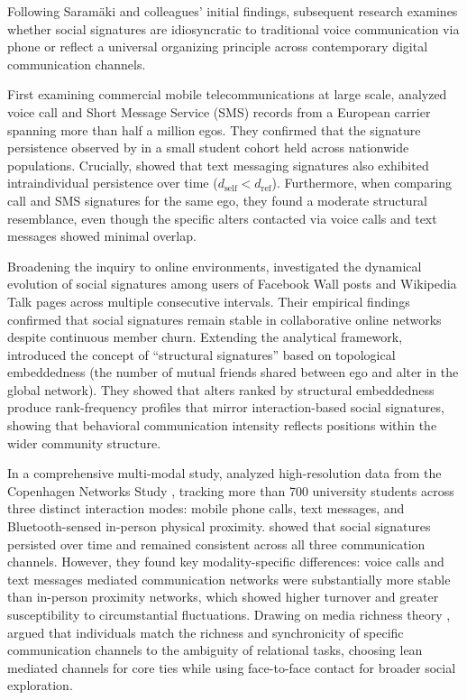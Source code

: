 \documentclass[11pt,letterpaper]{article}
\newcommand{\dself}{d_{\mathrm{self}}}
\newcommand{\dref}{d_{\mathrm{ref}}}
\begin{document}
Following Saram{\"a}ki and colleagues' initial findings, subsequent research examines whether social signatures are idiosyncratic to traditional voice communication via phone or reflect a universal organizing principle across contemporary digital communication channels. 

First examining commercial mobile telecommunications at large scale, \citet{heydari2018multichannel} analyzed voice call and Short Message Service (SMS) records from a European carrier spanning more than half a million egos. They confirmed that the signature persistence observed by \citet{saramaeki2014persistence} in a small student cohort held across nationwide populations. Crucially, \citet{heydari2018multichannel} showed that text messaging signatures also exhibited intraindividual persistence over time ($\dself < \dref$). Furthermore, when comparing call and SMS signatures for the same ego, they found a moderate structural resemblance, even though the specific alters contacted via voice calls and text messages showed minimal overlap. 

Broadening the inquiry to online environments, \citet{li2018social} investigated the dynamical evolution of social signatures among users of Facebook Wall posts and Wikipedia Talk pages across multiple consecutive intervals. Their empirical findings confirmed that social signatures remain stable in collaborative online networks despite continuous member churn. Extending the analytical framework, \citet{li2018social} introduced the concept of ``structural signatures'' based on topological embeddedness (the number of mutual friends shared between ego and alter in the global network). They showed that alters ranked by structural embeddedness produce rank-frequency profiles that mirror interaction-based social signatures, showing that behavioral communication intensity reflects positions within the wider community structure.

In a comprehensive multi-modal study, \citet{li2022evidence} analyzed high-resolution data from the Copenhagen Networks Study \citep{stopczynski2014measuring}, tracking more than 700 university students across three distinct interaction modes: mobile phone calls, text messages, and Bluetooth-sensed in-person physical proximity. \citet{li2022evidence} showed that social signatures persisted over time and remained consistent across all three communication channels. However, they found key modality-specific differences: voice calls and text messages mediated communication networks were substantially more stable than in-person proximity networks, which showed higher turnover and greater susceptibility to circumstantial fluctuations. Drawing on media richness theory \citep{daft1983information}, \citet{li2022evidence} argued that individuals match the richness and synchronicity of specific communication channels to the ambiguity of relational tasks, choosing lean mediated channels for core ties while using face-to-face contact for broader social exploration.
\end{document}

